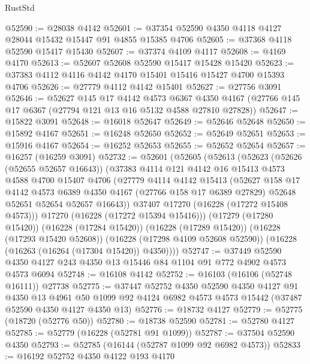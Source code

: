 \begin{lexlean}{RustStd}
\begin{coremodule}
@52590 := @28038 @4142
@52601 := @37354 @52590 @4350 @4118 @4127 @28044 @15432 @15447 @91 @4855 @15385 @4706
@52605 := @37368 @4118 @52590 @15417 @15430
@52607 := @37374 @4109 @4117
@52608 := @4169 @4170
@52613 := @52607 @52608 @52590 @15417 @15428 @15420
@52623 := @37383 @4112 @4116 @4142 @4170 @15401 @15416 @15427 @4700 @15393 @4706
@52626 := @27779 @4112 @4142 @15401
@52627 := @27756 @3091
@52646 := @52627
    @145
    @17
    @4142
    @4573
    @6367
    @4350
    @4167
    (@27766 @145 @17 @6367 (@27794 @121 @13 @16 @5132 @4588 @27810 @27828))
@52647 := @15822 @3091
@52648 := @16018 @52647
@52649 := @52646 @52648
@52650 := @15892 @4167
@52651 := @16248 @52650
@52652 := @52649 @52651
@52653 := @15916 @4167
@52654 := @16252 @52653
@52655 := @52652 @52654
@52657 := @16257 (@16259 @3091)
@52732 := @52601
    (@52605
      (@52613
        (@52623
          (@52626 (@52655 @52657 @16643))
          (@37383
            @4114
            @121
            @4142
            @16
            @15413
            @4573
            @4588
            @4700
            @15407
            @4706
            (@27779
              @4114
              @4142
              @15413
              (@52627
                @158
                @17
                @4142
                @4573
                @6389
                @4350
                @4167
                (@27766 @158 @17 @6389 @27829)
                @52648
                @52651
                @52654
                @52657
                @16643))
            @37407
            @17270
            (@16228 (@17272 @15408 @4573)))
          @17270
          (@16228 (@17272 @15394 @15416)))
        (@17279 (@17280 @15420))
        (@16228 (@17284 @15420))
        (@16228 (@17289 @15420))
        (@16228 (@17293 @15420 @52608))
        (@16228 (@17298 @4109 @52608 @52590))
        (@16228 (@16263 (@16264 (@17304 @15420)) @4350))))
@52747 := @37449 @52590 @4350 @4127 @243 @4350 @13 @15446 @84 @1104 @91 @772 @4902 @4573 @4573 @6094
@52748 := @16108 @4142
@52752 := @16103 (@16106 (@52748 @16111)) @27738
@52775 := @37447
    @52752
    @4350
    @52590
    @4350
    @4127
    @91
    @4350
    @13
    @4961
    @50
    @1099
    @92
    @4124
    @6982
    @4573
    @4573
    @15442
    (@37487 @52590 @4350 @4127 @4350 @13)
@52776 := @18732 @4127
@52779 := @52775 (@18720 (@52776 @50))
@52780 := @18738 @52590
@52781 := @52780 @4127
@52785 := @52779 (@16228 (@52781 @91 @1099))
@52787 := @37504 @52590 @4350
@52793 := @52785 (@16144 (@52787 @1099 @92 @6982 @4573))
@52833 := @16192
    @52752
    @4350
    @4122
    @193
    @4170

\end{coremodule}
\end{lexlean}

